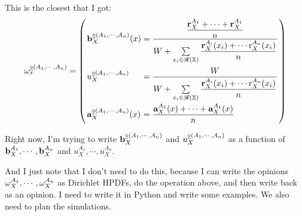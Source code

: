 \documentclass[a4paper,12pt]{article}
\theoremstyle{definition}
\theoremstyle{theorem}
\numberwithin{equation}{section}
\begin{document}
This is the closest that I got:
\begin{equation}
\arraycolsep=1.4pt\def\arraystretch{2.2}
\opia{\abfs(A_1, \cdots, A_n)}{x} =
\left(
\begin{array}{ll}
\bmdax{\abfs(A_1, \cdots, A_n)}{X}{x} & = \dfrac{\dfrac{\mathbf{r}^{A_1}_X + \cdots + \mathbf{r}^{A_1}_X}{n}}{W + \sum\limits_{x_i \in \hdom{X}} \dfrac{\mathbf{r}^{A_i}_X(x_i) + \cdots \mathrm{r}^{A_n}_X(x_i)}{n}} \\
u^{\abfs(A_1, \cdots, A_n)}_X & = \dfrac{W}{W + \sum\limits_{x_i \in \hdom{X}} \dfrac{\mathbf{r}^{A_i}_X(x_i) + \cdots \mathrm{r}^{A_n}_X(x_i)}{n}} \\
\adax{\abfs(A_1, \cdots, A_n)}{X}{x} & = \dfrac{\adax{A_1}{X}{x} + \cdots + \adax{A_1}{X}{x}}{n}
\end{array}
\right)
\end{equation}

Right now, I'm trying to write $\mathbf{b}^{\underline{\diamond}(A_1, \cdots, A_n)}_{X}$ and 
$u^{\underline{\diamond}(A_1, \cdots, A_n)}_X$ as a function of $\mathbf{b}^{A_1}_{X}, \cdots, \mathbf{b}^{A_n}_{X}$ and $u^{A_1}_X, \cdots, u^{A_n}_X$.

And I just note that I don't need to do this, because I can write the opinions $\omega^{A_1}_{X}, \cdots, \omega^{A_n}_{X}$ as Dirichlet HPDFs, do the operation above, and then write back as an opinion. I need to write it in Python and write some examples. We also need to plan the simulations.


\printbibliography
\end{document}
